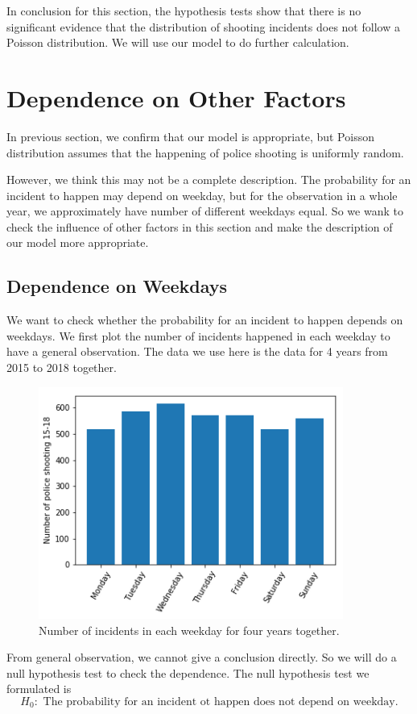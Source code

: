 \documentclass[11pt,a4paper,english]{article}
\begin{document}
In conclusion for this section, the hypothesis tests show that there is no significant evidence that the distribution of shooting incidents does not follow a Poisson distribution. We will use our model to do further calculation.
\section{Dependence on Other Factors}
In previous section, we confirm that our model is appropriate, but Poisson distribution assumes that the happening of police shooting is uniformly random. 

However, we think this may not be a complete description. 
The probability for an incident to happen may depend on weekday, but for the observation in a whole year, we approximately have number of different weekdays equal. 
So we wank to check the influence of other factors in this section and make the description of our model more appropriate. 
\subsection{Dependence on Weekdays}
We want to check whether the probability for an incident to happen depends on weekdays. We first plot the number of incidents happened in each weekday to have a general observation. The data we use here is the data for 4 years from 2015 to 2018 together.
\begin{figure}[htbp]
	\centering
	\includegraphics[width = 10cm]{weekdays.png}
	\caption{Number of incidents in each weekday for four years together.}
\end{figure}

From general observation, we cannot give a conclusion directly. So we will do a null hypothesis test to check the dependence. The null hypothesis test we formulated is
\begin{equation*}
	H_{0}:\text{ The probability for an incident ot happen does not depend on weekday.}
\end{equation*} 
\end{document}
